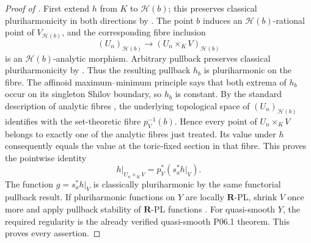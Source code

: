 \begin{proof}[Proof of
]
First extend \(h\) from \(K\) to \(\mathscr H(b)\); this preserves
classical pluriharmonicity in both directions by
\cite[Proposition~7.2(6)]{GR25Classical}.  The point \(b\) induces an
\(\mathscr H(b)\)-rational point of \(V_{\mathscr H(b)}\), and the
corresponding fibre inclusion
\[
 (U_n)_{\mathscr H(b)}
 \longrightarrow (U_n\times_KV)_{\mathscr H(b)}
\]
is an \(\mathscr H(b)\)-analytic morphism.  Arbitrary pullback preserves
classical pluriharmonicity by
\cite[Proposition~7.2(7)]{GR25Classical}.  Thus the resulting pullback
\(h_b\) is pluriharmonic on the fibre.  The affinoid maximum--minimum
principle \cite[Proposition~7.3]{GR25Classical} says that both extrema of
\(h_b\) occur on its singleton Shilov boundary, so \(h_b\) is constant.
By the standard description of analytic fibres
\cite[\S2.7]{GR25Classical}, the underlying topological space of
\((U_n)_{\mathscr H(b)}\) identifies with the set-theoretic fibre
\(p_V^{-1}(b)\).  Hence every point of \(U_n\times_KV\) belongs to
exactly one of the analytic fibres just treated.  Its value under \(h\)
consequently equals the value at the toric-fixed section in that fibre.
This proves the pointwise identity
\[
              h|_{U_n\times_KV}=p_V^*(s_a^*h|_V).
\]
The function \(g=s_a^*h|_V\) is classically pluriharmonic by the same
functorial pullback result.  If pluriharmonic functions on \(Y\) are locally
\(\mathbf R\)-PL, shrink \(V\) once more and apply pullback stability of
\(\mathbf R\)-PL functions
\cite[Lemma~5.4(1)]{GJR26}.  For quasi-smooth \(Y\), the required
regularity is the already verified quasi-smooth P06.1 theorem.  This
proves every assertion.
\end{proof}


